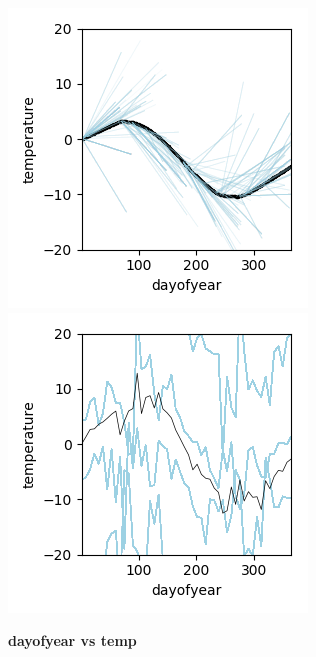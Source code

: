 \documentclass[12pt]{article}
\begin{document}
\begin{figure}[htbp]
\begin{center}
\includegraphics[scale=0.7]{images/dayofyear_vs_temp_stratpd.png}
\includegraphics[scale=0.7]{images/dayofyear_vs_temp_pdp.png}
\caption{{\bf  dayofyear  vs temp}}
\label{fig:dayofyear_vs_temp}
\end{center}
\end{figure}
\end{document}
